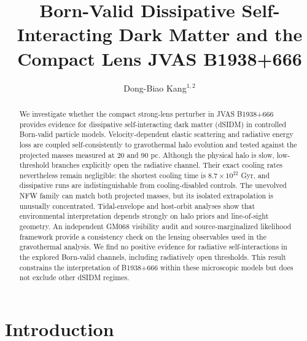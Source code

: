 \documentclass[12pt]{iopart}
\newcommand{\jcap}{JCAP}
\begin{document}
\title[Born-valid dSIDM and B1938+666]{Born-Valid Dissipative Self-Interacting
Dark Matter and the Compact Lens JVAS B1938+666}

\author{Dong-Biao Kang$^{1,2}$}

\address{$^1$ Zhejiang Guangsha Vocational and Technological University of
China, Dongyang, Zhejiang, People's Republic of China}
\address{$^2$ Institute of Theoretical Physics, Chinese Academy of Sciences,
Beijing, People's Republic of China}
\address{ORCID: \href{https://orcid.org/0000-0002-4820-3662}
{0000-0002-4820-3662}}

\begin{abstract}
We investigate whether the compact strong-lens perturber in JVAS B1938+666
provides evidence for dissipative self-interacting dark matter (dSIDM) in
controlled Born-valid particle models.  Velocity-dependent elastic scattering
and radiative energy loss are coupled self-consistently to gravothermal halo
evolution and tested against the projected masses measured at 20 and 90 pc.
Although the physical halo is slow, low-threshold branches explicitly open the
radiative channel.  Their exact cooling rates nevertheless remain negligible:
the shortest cooling time is $8.7\times10^{22}$ Gyr, and dissipative runs are
indistinguishable from cooling-disabled controls.  The unevolved NFW family can
match both projected masses, but its isolated extrapolation is unusually
concentrated.  Tidal-envelope and host-orbit analyses show that environmental
interpretation depends strongly on halo priors and line-of-sight geometry.  An
independent GM068 visibility audit and source-marginalized likelihood framework
provide a consistency check on the lensing observables used in the gravothermal
analysis.  We find no positive evidence for radiative self-interactions in the
explored Born-valid channels, including radiatively open thresholds.  This
result constrains the interpretation of B1938+666 within these microscopic
models but does not exclude other dSIDM regimes.
\end{abstract}

\submitto{\jcap}

\maketitle

\section{Introduction}
\label{sec:introduction}
\end{document}
